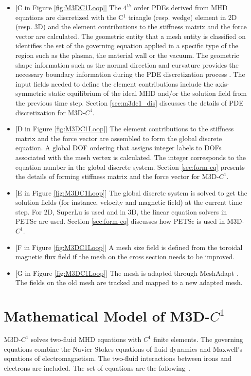 \documentclass[11pt]{article}  %
\begin{document}
\begin{itemize}
\item{[C in Figure \ref{fig:M3DC1Loop}]} The $4^{th}$ order PDEs derived from MHD equations are discretized with the C$^1$  triangle (resp. wedge) element in 2D (resp. 3D) \cite{jardin2004triangular,ferraro2009calculations, jardin2012multiple} and the element contributions to the stiffness matrix and the force vector are calculated.  The geometric entity that a mesh entity is classified on identifies the set of the governing equation applied in a specific type of the region such as the plasma, the material wall or the vacuum. The geometric shape information such as the normal direction and curvature provides the necessary boundary information during the  PDE discretization process \cite{jardin2010computational}. The input fields needed to define the element contributions include the axis-symmetric static equilibrium of the ideal MHD and/or the solution field from the previous time step. Section \ref{sec:m3dc1_dis} discusses the details of PDE discretization for M3D-$C^1$.
\item{[D in Figure \ref{fig:M3DC1Loop}]} The element contributions to the stiffness matrix and the force vector are assembled to form the global discrete equation. A global DOF ordering that assigns integer labels to DOFs associated with the mesh vertex is calculated. The integer corresponds to the equation number in the global discrete system. Section \ref{sec:form-eq} presents the details of forming stiffness matrix and the force vector for M3D-$C^1$.
\item{[E in Figure \ref{fig:M3DC1Loop}]} The global discrete system is solved to get the solution fields (for instance, velocity and magnetic field) at the current time step. For 2D, SuperLu \cite{superlu_ug99} is used and in 3D, the linear equation solvers in PETSc \cite{petsc-web-page} are used. Section \ref{sec:form-eq} discusses how PETSc is used in M3D-$C^1$.
\item{[F in Figure \ref{fig:M3DC1Loop}]} A mesh size field is defined from the toroidal magnetic flux field  if the mesh on the cross section needs to be improved. 
\item{[G in Figure \ref{fig:M3DC1Loop}]} The mesh is adapted through MeshAdapt \cite{li20053d,sahni2007automated, lu2013parallel}.  The fields on the old mesh are tracked and mapped to a new adapted mesh. 
\end{itemize}


\section{Mathematical Model of M3D-$C^1$} \label{sec:mhd}
M3D-$C^1$ solves two-fluid MHD equations with $C^1$ finite elements. The governing equations combine the Navier-Stokes equations of fluid dynamics and Maxwell's equations of electromagnetism.  The two-fluid interactions between irons and electrons are included. The set of equations are the following~\cite{ferraro2009calculations, Jardin2013NSTX, Jardin2014Extend, jardin2012multiple}.
\end{document}
